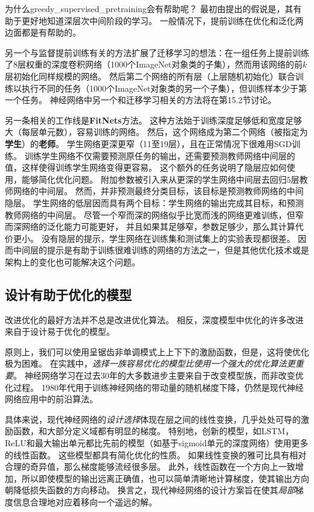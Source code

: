 为什么\gls{greedy_supervised_pretraining}会有帮助呢？
最初由\cite{Bengio-nips-2006}提出的假说是，其有助于更好地知道深层次中间阶段的学习。
一般情况下，提前训练在优化和泛化两边面都是有帮助的。

另一个与监督提前训练有关的方法扩展了迁移学习的想法：\cite{yosinski-nips2014}在一组任务上提前训练了$8$层权重的深度卷积网络（1000个ImageNet对象类的子集），然而用该网络的前$k$层初始化同样规模的网络。
然后第二个网络的所有层（上层随机初始化）联合训练以执行不同的任务（1000个ImageNet对象类的另一个子集），但训练样本少于第一个任务。
神经网络中另一个和迁移学习相关的方法将在第15.2节讨论。

另一条相关的工作线是\textbf{FitNets}\citep{Romero-et-al-ICLR2015-small}方法。
这种方法始于训练深度足够低和宽度足够大（每层单元数），容易训练的网络。
然后，这个网络成为第二个网络（被指定为\textbf{学生}）的\textbf{老师}。
学生网络更深更窄（11至19层），且在正常情况下很难用SGD训练。
训练学生网络不仅需要预测原任务的输出，还需要预测教师网络中间层的值，这样使得训练学生网络变得更容易。
这个额外的任务说明了隐层应如何使用，能够简化优化问题。
附加参数被引入来从更深的学生网络中间层去回归$5$层教师网络的中间层。
然而，并非预测最终分类目标，该目标是预测教师网络的中间隐层。
学生网络的低层因而具有两个目标：学生网络的输出完成其目标，和预测教师网络的中间层。
尽管一个窄而深的网络似乎比宽而浅的网络更难训练，但窄而深网络的泛化能力可能更好，
并且如果其足够窄，参数足够少，那么其计算代价更小。
没有隐层的提示，学生网络在训练集和测试集上的实验表现都很差。
因而中间层的提示是有助于训练很难训练的网络的方法之一，但是其他优化技术或是架构上的变化也可能解决这个问题。


\subsection{设计有助于优化的模型}
\label{sec:designing_models_to_aid_optimization}
改进优化的最好方法并不总是改进优化算法。
相反，深度模型中优化的许多改进来自于设计易于优化的模型。

原则上，我们可以使用呈锯齿非单调模式上上下下的激励函数，但是，这将使优化极为困难。
在实践中，\emph{选择一族容易优化的模型比使用一个强大的优化算法更重要}。
神经网络学习在过去30年的大多数进步主要来自于改变模型族，而非改变优化过程。
1980年代用于训练神经网络的带动量的随机梯度下降，仍然是现代神经网络应用中的前沿算法。

具体来说，现代神经网络的\emph{设计选择}体现在层之间的线性变换，几乎处处可导的激励函数，和大部分定义域都有明显的梯度。
特别地，创新的模型，如LSTM，\gls{ReLU}和最大输出单元都比先前的模型（如基于sigmoid单元的深度网络）使用更多的线性函数。
这些模型都具有简化优化的性质。
如果线性变换的雅可比具有相对合理的奇异值，那么梯度能够流经很多层。
此外，线性函数在一个方向上一致增加，所以即使模型的输出远离正确值，也可以简单清晰地计算梯度，使其输出方向朝降低损失函数的方向移动。
换言之，现代神经网络的设计方案旨在使其\emph{局部}梯度信息合理地对应着移向一个遥远的解。

